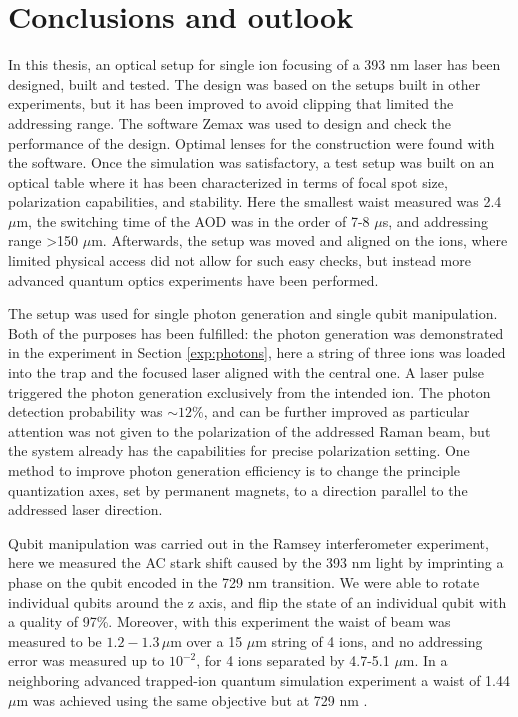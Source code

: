 
\chapter{Conclusions and outlook}
In this thesis, an optical setup for single ion focusing of a 393 nm laser has been designed, built and tested. The design was based on the setups built in other experiments, but it has been improved to avoid clipping that limited the addressing range. The software Zemax was used to design and check the performance of the design. Optimal lenses for the construction were found with the software. Once the simulation was satisfactory, a test setup was built on an optical table where it has been characterized in terms of focal spot size, polarization capabilities, and stability. Here the smallest waist measured was 2.4 $\mu$m, the switching time of the AOD was in the order of 7-8 $\mu$s, and addressing range >150 $\mu$m. Afterwards, the setup was moved and aligned on the ions, where limited physical access did not allow for such easy checks, but instead more advanced quantum optics experiments have been performed.\par
The setup was used for single photon generation and single qubit manipulation. Both of the purposes has been fulfilled: the photon generation was demonstrated in the experiment in Section \ref{exp:photons}, here a string of three ions was loaded into the trap and the focused laser aligned with the central one. A laser pulse triggered the photon generation exclusively from the intended ion. The photon detection probability was $\sim 12\%$, and can be further improved as particular attention was not given to the polarization of the addressed Raman beam, but the system already has the capabilities for precise polarization setting. One method to improve photon generation efficiency is to change the principle quantization axes, set by permanent magnets, to a direction parallel to the addressed laser direction. \par
Qubit manipulation was carried out in the Ramsey interferometer experiment, here we measured the AC stark shift caused by the 393 nm light by imprinting a phase on the qubit encoded in the 729 nm transition. We were able to rotate individual qubits around the z axis, and flip the state of an individual qubit with a quality of 97\%. Moreover, with this experiment the waist of beam was measured to be $1.2-1.3\,\mu$m over a 15 $\mu$m string of 4 ions, and no addressing error was measured up to $10^{-2}$, for 4 ions separated by 4.7-5.1 $\mu$m. In a neighboring advanced trapped-ion quantum simulation experiment a waist of 1.44 $\mu$m was achieved using the same objective but at 729 nm \cite{hempel}.\par
